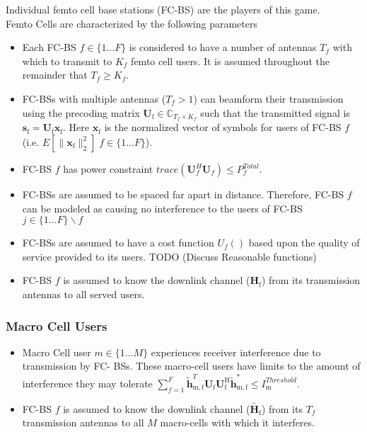 \documentclass[12pt]{article}
\begin{document}
Individual femto cell base stations (FC-BS) are the players of this game.
\\
Femto Cells are characterized by the following parameters
\begin{itemize}
\item 
	Each FC-BS  $f \in \{1 ... F\}$ is considered to have a number of antennas $T_f$ with which to transmit to $K_f$ femto cell users. It is assumed throughout the remainder that $T_f \geq K_f$.
\\
\item 
	FC-BSs with multiple antennas ($T_f >1$) can beamform their transmission using the precoding 	
	matrix $\mathbf{U}_{\mathrm{f}} \in \mathbb{C}_{T_f \times K_f}$ such that the transmitted 		
	signal is $\mathbf{s}_{\mathrm{f}
	}= \mathbf{U_{\mathrm{f}}}\mathbf{x_{\mathrm{f}}}$. Here $\mathbf{x_{\mathrm{f}}}$ is the 		
	normalized vector of symbols for users of FC-BS $f$ (i.e. $E[\|\mathbf{x}_{\mathrm{f}}
	\|_2^2] \; f \in \{1 ... F\}$).
\\
\item 
	FC-BS $f$ has power constraint $trace(\mathbf{U}_f^H\mathbf{U}_f) \leq P^{Total}_{f} $.
\\
\item
	 FC-BSs are assumed to be spaced far apart in distance. Therefore, FC-BS $f$ can be modeled as 
	 causing no interference to the users of FC-BS $j \in \{1 ... F\}\backslash f$
\item 
	FC-BSs are assumed to have a cost function $U_f()$ based upon the quality of service 		
	provided to its users. TODO (Discuss Reasonable functions)
\\
\item 
	FC-BS $f$ is assumed to know the downlink channel ($\mathbf{H_\mathrm{f}}$) from its transmission 		
	antennas to all served users.
\\
\end{itemize}

\subsubsection{Macro Cell Users}

\begin{itemize}
\item 
	Macro Cell user $m \in \{1 ... M\}$ experiences receiver interference due to transmission by
	FC-	BSs. These macro-cell users have limits to the amount of interference they may tolerate 
	$\sum^F_{f=1} \mathbf{\tilde{h}}_{\mathrm{m,f}}^T  \mathbf{U_{\mathrm{f}}} 						
	\mathbf{U_{\mathrm{f}}^{\mathrm{H}}} \mathbf{\tilde{h}_{\mathrm{m,f}}^*} \leq I^{Threshold}		
	_{\mathrm{m}} $.

\item 
	FC-BS $f$ is assumed to know the downlink channel ($\tilde{\mathbf{H}_{\mathrm{f}}}$) from its $T_f$
	transmission antennas to all $M$ macro-cells with which it interferes.
\\
\end{itemize}
\end{document}
